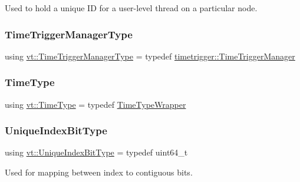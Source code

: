 Used to hold a unique ID for a user-\/level thread on a particular node. 

\mbox{\label{namespacevt_ab6a0fefc7e53fbe4eaec0fef22ae15e3}} 
\subsubsection{\texorpdfstring{Time\+Trigger\+Manager\+Type}{TimeTriggerManagerType}}
{\footnotesize\ttfamily using \hyperlink{namespacevt_ab6a0fefc7e53fbe4eaec0fef22ae15e3}{vt\+::\+Time\+Trigger\+Manager\+Type} = typedef \hyperlink{structvt_1_1timetrigger_1_1_time_trigger_manager}{timetrigger\+::\+Time\+Trigger\+Manager}}

\mbox{\label{namespacevt_a2b9f28078dc309ad0706b69ded743e69}} 
\subsubsection{\texorpdfstring{Time\+Type}{TimeType}}
{\footnotesize\ttfamily using \hyperlink{namespacevt_a2b9f28078dc309ad0706b69ded743e69}{vt\+::\+Time\+Type} = typedef \hyperlink{structvt_1_1_time_type_wrapper}{Time\+Type\+Wrapper}}

\mbox{\label{namespacevt_a913e1f07b5228dd8bb64040dc6dcea14}} 
\subsubsection{\texorpdfstring{Unique\+Index\+Bit\+Type}{UniqueIndexBitType}}
{\footnotesize\ttfamily using \hyperlink{namespacevt_a913e1f07b5228dd8bb64040dc6dcea14}{vt\+::\+Unique\+Index\+Bit\+Type} = typedef uint64\+\_\+t}



Used for mapping between index to contiguous bits. 

\mbox{\label{namespacevt_ac115668758184050beff7a9281a2c490}} 
